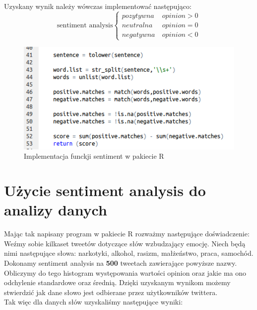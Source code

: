\documentclass[12pt,a4paper]{article}
\begin{document}
Uzyskany wynik należy wówczas implementować następująco: \\
\[\mbox{sentiment analysis} \left \lbrace \begin{array}{cl}
pozytywna &~ opinion > 0 \\
neutralna &~ opinion=0 \\
negatywna &~ opinion < 0
\end{array} \right. \]
\begin{figure}[H]
\begin{center}
\includegraphics[scale=0.5]{pictures/Code6.png}
\caption{Implementacja funckji sentiment w pakiecie R}
\end{center}
\end{figure}


\section[Użycie sentiment analysis do analizy danych]{Użycie sentiment analysis do analizy danych}
Mając tak napisany program w pakiecie R rozważmy następujące doświadczenie: Weźmy sobie kilkaset tweetów dotyczące słów wzbudzający emocję. Niech będą nimi następujące słowa: narkotyki, alkohol, rasizm, małżeństwo, praca, samochód. Dokonamy sentiment analysis na  \textbf{500} tweetach zawierające powyższe nazwy. Obliczymy do tego histogram występowania wartości opinion oraz jakie ma ono odchylenie standardowe oraz średnią. Dzięki uzyskanym wynikom możemy stwierdzić jak dane słowo jest odbierane przez użytkowników twittera.\\
Tak więc dla danych słów uzyskaliśmy następujące wyniki: \\
\end{document}
